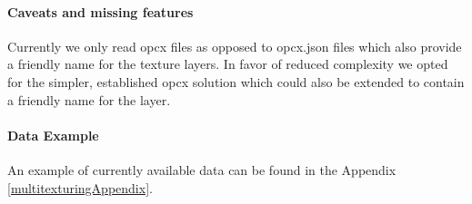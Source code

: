 \paragraph{Caveats and missing features}
Currently we only read opcx files as opposed to opcx.json files which also provide a friendly name for the texture layers. In favor of reduced complexity we opted for the simpler, established opcx solution which could also be extended to contain a friendly name for the layer.

\paragraph{Data Example}
An example of currently available data can be found in the Appendix \ref{multitexturingAppendix}.


